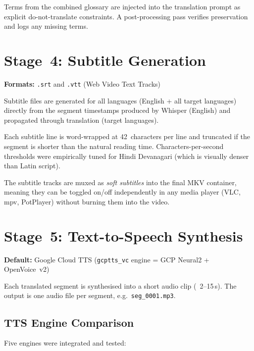 \documentclass[12pt,a4paper]{article}
\begin{document}
Terms from the combined glossary are injected into the translation prompt as
explicit do-not-translate constraints.  A post-processing pass verifies
preservation and logs any missing terms.

\section{Stage~4: Subtitle Generation}

\textbf{Formats:} \texttt{.srt} and \texttt{.vtt} (Web Video Text Tracks)

Subtitle files are generated for all languages (English + all target
languages) directly from the segment timestamps produced by Whisper
(English) and propagated through translation (target languages).

Each subtitle line is word-wrapped at 42~characters per line and truncated
if the segment is shorter than the natural reading time.  Characters-per-second
thresholds were empirically tuned for Hindi Devanagari (which is visually
denser than Latin script).

The subtitle tracks are muxed as \emph{soft subtitles} into the final MKV
container, meaning they can be toggled on/off independently in any media
player (VLC, mpv, PotPlayer) without burning them into the video.

\section{Stage~5: Text-to-Speech Synthesis}

\textbf{Default:} Google Cloud TTS (\texttt{gcptts\_vc} engine = GCP Neural2 + OpenVoice~v2)

Each translated segment is synthesised into a short audio clip (~2--15\,s).
The output is one audio file per segment, e.g.\ \texttt{seg\_0001.mp3}.

\subsection{TTS Engine Comparison}

Five engines were integrated and tested:
\end{document}

